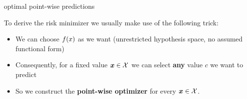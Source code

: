 \begin{frame}[t]{optimal point-wise predictions}  

To derive the risk minimizer we usually make use of the following trick: 

\begin{itemize}
	\item We can choose $f(x)$ as we want (unrestricted hypothesis space, no assumed functional form)
	\item Consequently, for a fixed value $\bm{x} \in \mathcal{X}$ we can select \textbf{any} value $c$ we want to predict 
	\item So we construct the \textbf{point-wise optimizer} for every $\bm{x} \in \mathcal{X}$.
\end{itemize}

\lz

\begin{overlayarea}{\textwidth}{\textheight}
\begin{center}
\end{center}
\end{overlayarea} 


\end{frame}


